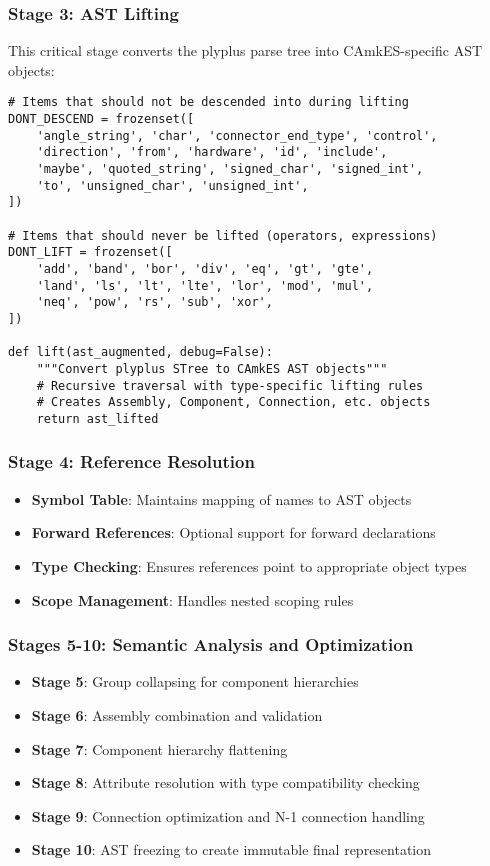 \documentclass[12pt,a4paper]{article}
\begin{document}
\subsubsection{Stage 3: AST Lifting}
This critical stage converts the plyplus parse tree into CAmkES-specific AST objects:


\begin{lstlisting}[style=python]
# Items that should not be descended into during lifting
DONT_DESCEND = frozenset([
    'angle_string', 'char', 'connector_end_type', 'control',
    'direction', 'from', 'hardware', 'id', 'include',
    'maybe', 'quoted_string', 'signed_char', 'signed_int',
    'to', 'unsigned_char', 'unsigned_int',
])

# Items that should never be lifted (operators, expressions)
DONT_LIFT = frozenset([
    'add', 'band', 'bor', 'div', 'eq', 'gt', 'gte',
    'land', 'ls', 'lt', 'lte', 'lor', 'mod', 'mul',
    'neq', 'pow', 'rs', 'sub', 'xor',
])

def lift(ast_augmented, debug=False):
    """Convert plyplus STree to CAmkES AST objects"""
    # Recursive traversal with type-specific lifting rules
    # Creates Assembly, Component, Connection, etc. objects
    return ast_lifted
\end{lstlisting}

\subsubsection{Stage 4: Reference Resolution}
\begin{itemize}
    \item \textbf{Symbol Table}: Maintains mapping of names to AST objects
    \item \textbf{Forward References}: Optional support for forward declarations
    \item \textbf{Type Checking}: Ensures references point to appropriate object types
    \item \textbf{Scope Management}: Handles nested scoping rules
\end{itemize}

\subsubsection{Stages 5-10: Semantic Analysis and Optimization}
\begin{itemize}
    \item \textbf{Stage 5}: Group collapsing for component hierarchies
    \item \textbf{Stage 6}: Assembly combination and validation
    \item \textbf{Stage 7}: Component hierarchy flattening
    \item \textbf{Stage 8}: Attribute resolution with type compatibility checking
    \item \textbf{Stage 9}: Connection optimization and N-1 connection handling
    \item \textbf{Stage 10}: AST freezing to create immutable final representation
\end{itemize}
\end{document}
